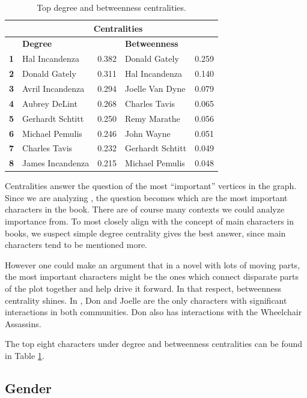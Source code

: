 \begin{table}[]
\begin{tabular}{@{}lllll@{}}
\toprule
 & \multicolumn{4}{c}{\textbf{Centralities}} \\ \midrule
 & \multicolumn{2}{l}{\textbf{Degree}}  & \multicolumn{2}{l}{\textbf{Betweenness}} \\ \midrule
\textbf{1} & Hal Incandenza   & 0.382 & Donald Gately   & 0.259 \\ \midrule
\textbf{2} & Donald Gately    & 0.311 & Hal Incandenza  & 0.140 \\ \midrule
\textbf{3} & Avril Incandenza & 0.294 & Joelle Van Dyne & 0.079 \\ \midrule
\textbf{4} & Aubrey DeLint    & 0.268 & Charles Tavis   & 0.065 \\ \midrule
\textbf{5} & Gerhardt Schtitt & 0.250 & Remy Marathe    & 0.056 \\ \midrule
\textbf{6} & Michael Pemulis  & 0.246 & John Wayne       & 0.051 \\ \midrule
\textbf{7} & Charles Tavis    & 0.232 & Gerhardt Schtitt & 0.049 \\ \midrule
\textbf{8} & James Incandenza & 0.215 & Michael Pemulis  & 0.048 \\ \toprule
\end{tabular}
    \caption{Top degree and betweenness centralities.}
    \label{tab:centralities}

\end{table}

Centralities answer the question of the most ``important'' vertices in the graph. Since we are analyzing \infinitejest, the question becomes which are the most important characters in the book. There are of course many contexts we could analyze importance from. To most closely align with the concept of main characters in books, we suspect simple degree centrality gives the best answer, since main characters tend to be mentioned more. 

However one could make an argument that in a novel with lots of moving parts, the most important characters might be the ones which connect disparate parts of the plot together and help drive it forward. In that respect, betweenness centrality shines. In \infinitejest, Don and Joelle are the only characters with significant interactions in both communities. Don also has interactions with the Wheelchair Assassins.

The top eight characters under degree and betweenness centralities can be found in Table \ref{tab:centralities}.



\subsection{Gender}


